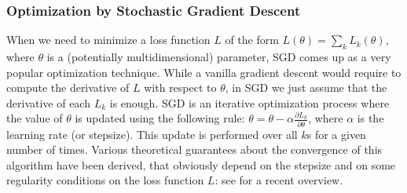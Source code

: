 \subsubsection{Optimization by Stochastic Gradient Descent}

When we need to minimize a loss function $L$ of the form $L(\theta) = \sum_k
L_k(\theta)$, where $\theta$ is a (potentially multidimensional) parameter, SGD
comes up as a very popular optimization technique. While a vanilla gradient
descent would require to compute the derivative of $L$ with respect to
$\theta$, in SGD we just assume that the derivative of each $L_k$ is enough.
SGD is an iterative optimization process where the value of $\theta$ is updated
using the following rule: $\theta = \theta - \alpha \frac{\partial
L_k}{\partial \theta}$, where $\alpha$ is the learning rate (or stepsize). This
update is performed over all $k$s for a given number of times. Various
theoretical guarantees about the convergence of this algorithm have been
derived, that obviously depend on the stepsize and on some regularity
conditions on the loss function $L$: see \cite{BotCurNoc16} for a recent
overview.

